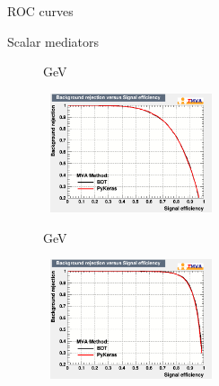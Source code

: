 \documentclass[8pt]{beamer}
\begin{document}
\begin{frame}{ROC curves}
\justifying
\begin{block}{\centering Scalar mediators}\end{block} \vspace{-10pt}
\begin{figure}[htbp]
\centering
\begin{minipage}[b]{.49\textwidth}
\vspace{-5pt}
\begin{block}{ GeV}\end{block}
\begin{center}
\includegraphics[width=5.2cm, height=3.5cm]{figs/ROC_scalar100.png}
\end{center}
\end{minipage}
\begin{minipage}[b]{.02\textwidth}\end{minipage}
\begin{minipage}[b]{.49\textwidth}
\vspace{-5pt}
\begin{block}{ GeV}\end{block}
\begin{center}
\includegraphics[width=5.2cm, height=3.5cm]{figs/ROC_scalar500.png}
\end{center}
\end{minipage}
\end{figure} \vfill


\end{frame}
\end{document}
